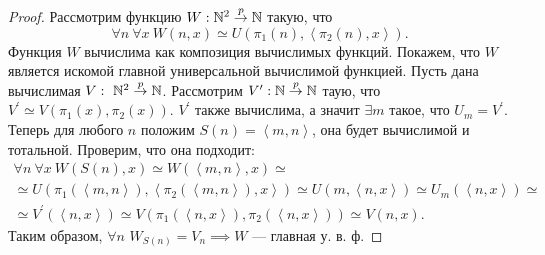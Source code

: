 \begin{proof}
    Рассмотрим функцию $W: \mathbb{N}^{2} \overset{p}{\to} \mathbb{N}$ такую, что 
    $$
    \forall n~\forall x~W\left(n, x\right) \simeq U\left(\pi_{1}\left(n\right), \left\langle \pi_{2}\left(n\right), x\right\rangle\right).
    $$
    Функция $W$ вычислима как композиция вычислимых функций.
    Покажем, что $W$ является искомой главной универсальной вычислимой функцией.
    Пусть дана вычислимая $V:~\mathbb{N}^{2} \overset{p}{\to} \mathbb{N}$.
    Рассмотрим $V^{\prime}: \mathbb{N} \overset{p}{\to} \mathbb{N}$ таую, что $V^{\prime} \simeq V\left(\pi_{1}\left(x\right), \pi_{2}\left(x\right)\right)$.
    $V^{\prime}$ также вычислима, а значит $\exists m$ такое, что $U_{m} = V^{\prime}$.
    Теперь для любого $n$ положим $S\left(n\right) = \left\langle m, n\right\rangle$, она будет вычислимой и тотальной.
    Проверим, что она подходит:
    \begin{multline}
        \forall n~\forall x~W\left(S\left(n\right), x\right) \simeq W\left(\left\langle m, n\right\rangle, x\right) \simeq \\ \simeq U\left(\pi_{1}\left(\left\langle m, n\right\rangle\right), \left\langle \pi_{2}\left(\left\langle m, n\right\rangle\right), x\right\rangle\right) \simeq U\left(m, \left\langle n, x\right\rangle\right) \simeq U_{m}\left(\left\langle n, x\right\rangle\right) \simeq \\ \simeq V^{\prime}\left(\left\langle n, x\right\rangle\right) \simeq V\left(\pi_{1}\left(\left\langle n, x\right\rangle\right), \pi_{2}\left(\left\langle n, x\right\rangle\right)\right) \simeq V\left(n, x\right).
    \end{multline}
    Таким образом, $\forall n$ $W_{S\left(n\right)} = V_{n} \implies W$ --- главная у. в. ф.
\end{proof}
